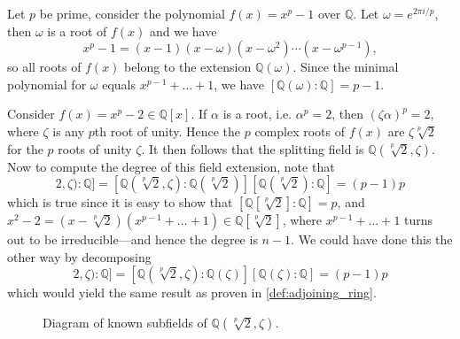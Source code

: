   \begin{example}
    Let $p$ be prime, consider the polynomial $f(x) = x^p - 1$ over $\mathbb{Q}$. Let $\omega = e^{2\pi i/p}$, then $\omega$ is a root of $f(x)$ and we have
    \begin{equation}
      x^p - 1 = (x - 1)(x - \omega)(x - \omega^2)\cdots(x - \omega^{p-1}),
    \end{equation}
    so all roots of $f(x)$ belong to the extension $\mathbb{Q}(\omega)$. Since the minimal polynomial for $\omega$ equals $x^{p-1} + \ldots + 1$, we have $[\mathbb{Q}(\omega) : \mathbb{Q}] = p - 1$.
  \end{example}

  \begin{example}
    Consider $f(x) = x^p - 2 \in \mathbb{Q}[x]$. If $\alpha$ is a root, i.e. $\alpha^p = 2$, then $(\zeta \alpha)^p = 2$, where $\zeta$ is any $p$th root of unity. Hence the $p$ complex roots of $f(x)$ are $\zeta \sqrt[p]{2}$ for the $p$ roots of unity $\zeta$. It then follows that the splitting field is $\mathbb{Q}(\sqrt[p]{2}, \zeta)$. Now to compute the degree of this field extension, note that
    \begin{equation}
      [\mathbb{Q}(\sqrt[p]{2}, \zeta): \mathbb{Q}] = [\mathbb{Q}(\sqrt[p]{2}, \zeta): \mathbb{Q}(\sqrt[p]{2})] [\mathbb{Q}(\sqrt[p]{2}): \mathbb{Q}] = (p - 1) p
    \end{equation}
    which is true since it is easy to show that $[\mathbb{Q}[\sqrt[p]{2}]: \mathbb{Q}] =  p$, and $x^2 - 2 = (x - \sqrt[p]{2}) (x^{p-1} + \ldots + 1) \in \mathbb{Q}[\sqrt[p]{2}]$, where $x^{p-1} + \ldots + 1$ turns out to be irreducible---and hence the degree is $n-1$. We could have done this the other way by decomposing 
    \begin{equation}
      [\mathbb{Q}(\sqrt[p]{2}, \zeta): \mathbb{Q}] = [\mathbb{Q}(\sqrt[p]{2}, \zeta): \mathbb{Q}(\zeta)] [\mathbb{Q}(\zeta): \mathbb{Q}] = (p - 1) p
    \end{equation}
    which would yield the same result as proven in \ref{def:adjoining_ring}.

    \begin{figure}[H]
      \centering 
      \caption{Diagram of known subfields of $\mathbb{Q}(\sqrt[p]{2}, \zeta)$. } 
      \label{fig:splittingfieldx_2}
    \end{figure}
  \end{example}

